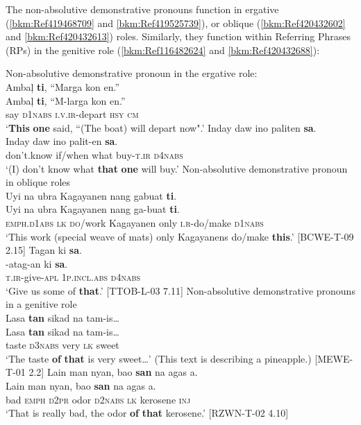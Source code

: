 The non-absolutive demonstrative pronouns function in ergative (\ref{bkm:Ref419468709} and \ref{bkm:Ref419525739}), or oblique (\ref{bkm:Ref420432602} and \ref{bkm:Ref420432613}) roles. Similarly, they function within Referring Phrases (RPs) in the genitive role (\ref{bkm:Ref116482624} and \ref{bkm:Ref420432688}):

\newpage
\ea
\label{bkm:Ref419468709}
Non-absolutive demonstrative pronoun in the ergative role: \\
Ambaļ  \textbf{ti},   “Marga  kon  en.” \\\smallskip
 \gll Ambaļ  \textbf{ti},   “M-larga  kon  en.” \\
say  \textsc{d1nabs}  \textsc{i.v.ir}-depart  \textsc{hsy}  \textsc{cm} \\
\glt ‘\textbf{This} \textbf{one} said, “(The boat) will depart now".’
\z
\ea
\label{bkm:Ref419525739}
Inday  daw  ino  paliten  \textbf{sa}. \\\smallskip
 \gll Inday  daw  ino  palit-en  \textbf{sa}. \\
don’t.know  if/when  what  buy\textsc{-t.ir}  \textsc{d4nabs} \\
\glt ‘(I) don’t know what \textbf{that} \textbf{one} will buy.’
\z
\ea
\label{bkm:Ref420432602}
Non-absolutive demonstrative pronoun in oblique roles \\
Uyi  na  ubra  Kagayanen  nang  gabuat  \textbf{ti}. \\\smallskip
 \gll Uyi  na  ubra  Kagayanen  nang  ga-buat  \textbf{ti}. \\
\textsc{emph.d1abs}  \textsc{lk}  \textsc{do/}work  Kagayanen  only  \textsc{i.r}-do/make  \textsc{d1nabs} \\
\glt ‘This work (special weave of mats) only Kagayanens do/make \textbf{this}.’ [BCWE-T-09 2.15]
\z
\ea
\label{bkm:Ref420432613}
Tagan  ki  \textbf{sa}. \\\smallskip
 \gll \emptyset{}-atag-an  ki  \textbf{sa}. \\
\textsc{t.ir}-give\textsc{-apl}  1\textsc{p.incl.abs}  \textsc{d4nabs} \\
\glt ‘Give us some of \textbf{that}.’ [TTOB-L-03 7.11]
\z
\ea
\label{bkm:Ref116482624}
Non-absolutive demonstrative pronouns in a genitive role \\
Lasa \textbf{tan}  sikad  na  tam-is… \\\smallskip
 \gll Lasa \textbf{tan}  sikad  na  tam-is… \\
taste  \textsc{d3nabs}  very  \textsc{lk}  sweet \\
\glt ‘The taste \textbf{of} \textbf{that} is very sweet…’ (This text is describing a pineapple.) [MEWE-T-01 2.2]
\z
\ea
\label{bkm:Ref420432688}
Lain  man  nyan,  bao  \textbf{san}  na  agas  a. \\\smallskip
 \gll Lain  man  nyan,  bao  \textbf{san}  na  agas  a. \\
bad  \textsc{emph}  \textsc{d2pr}  odor  \textsc{d2nabs}  \textsc{lk}  kerosene  \textsc{inj} \\
\glt ‘That is really bad, the odor \textbf{of} \textbf{that} kerosene.’ [RZWN-T-02 4.10]
\z

